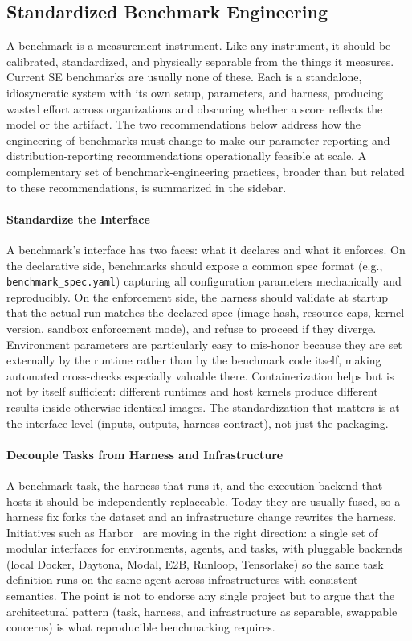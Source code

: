 \documentclass{IEEEcsmag}
\begin{document}
\subsection{Standardized Benchmark Engineering}
\label{sec:rec3}
A benchmark is a measurement instrument. Like any instrument, it should be calibrated, standardized, and physically separable from the things it measures. Current SE benchmarks are usually none of these. Each is a standalone, idiosyncratic system with its own setup, parameters, and harness, producing wasted effort across organizations and obscuring whether a score reflects the model or the artifact. The two recommendations below address how the engineering of benchmarks must change to make our parameter-reporting and distribution-reporting recommendations operationally feasible at scale. A complementary set of benchmark-engineering practices, broader than but related to these recommendations, is summarized in the sidebar.

\paragraph{Standardize the Interface} A benchmark's interface has two faces: what it declares and what it enforces. On the declarative side, benchmarks should expose a common spec format (e.g., \texttt{benchmark\_spec.yaml}) capturing all configuration parameters mechanically and reproducibly. On the enforcement side, the harness should validate at startup that the actual run matches the declared spec (image hash, resource caps, kernel version, sandbox enforcement mode), and refuse to proceed if they diverge. Environment parameters are particularly easy to mis-honor because they are set externally by the runtime rather than by the benchmark code itself, making automated cross-checks especially valuable there. Containerization helps but is not by itself sufficient: different runtimes and host kernels produce different results inside otherwise identical images. The standardization that matters is at the interface level (inputs, outputs, harness contract), not just the packaging.

\paragraph{Decouple Tasks from Harness and Infrastructure} A benchmark task, the harness that runs it, and the execution backend that hosts it should be independently replaceable. Today they are usually fused, so a harness fix forks the dataset and an infrastructure change rewrites the harness. Initiatives such as Harbor~\cite{harbor2026} are moving in the right direction: a single set of modular interfaces for environments, agents, and tasks, with pluggable backends (local Docker, Daytona, Modal, E2B, Runloop, Tensorlake) so the same task definition runs on the same agent across infrastructures with consistent semantics. The point is not to endorse any single project but to argue that the architectural pattern (task, harness, and infrastructure as separable, swappable concerns) is what reproducible benchmarking requires.
\end{document}
